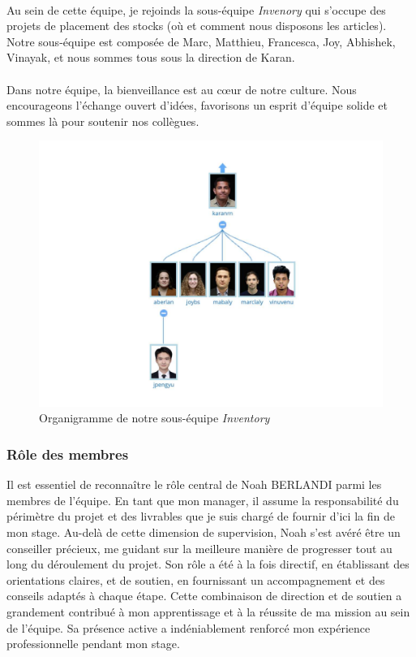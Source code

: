 \paragraph{}
\vspace{-2em}  %
Au sein de cette équipe, je rejoinds la sous-équipe \textit{Invenory} qui s'occupe des projets de placement des stocks (où et comment nous disposons les articles). Notre sous-équipe est composée de Marc, Matthieu, Francesca, Joy, Abhishek, Vinayak, et nous sommes tous sous la direction de Karan. 
\paragraph{}
\vspace{-2em}  %
Dans notre équipe, la bienveillance est au cœur de notre culture. Nous encourageons l'échange ouvert d'idées, favorisons un esprit d'équipe solide et sommes là pour soutenir nos collègues.

\newpage
\begin{figure}[htbp]
    \centering
    \includegraphics[width=0.8\linewidth]{./Graphismes-UTC/logos/Amazon/equipe.pdf}\hfill
    \caption{Organigramme de notre sous-équipe \textit{Inventory}} 
\end{figure}

\subsubsection{Rôle des membres}
\paragraphe{}
Il est essentiel de reconnaître le rôle central de Noah \MakeUppercase{Berlandi} parmi les membres de l'équipe. En tant que mon manager, il assume la responsabilité du périmètre du projet et des livrables que je suis chargé de fournir d'ici la fin de mon stage. Au-delà de cette dimension de supervision, Noah s'est avéré être un conseiller précieux, me guidant sur la meilleure manière de progresser tout au long du déroulement du projet. Son rôle a été à la fois directif, en établissant des orientations claires, et de soutien, en fournissant un accompagnement et des conseils adaptés à chaque étape. Cette combinaison de direction et de soutien a grandement contribué à mon apprentissage et à la réussite de ma mission au sein de l'équipe. Sa présence active a indéniablement renforcé mon expérience professionnelle pendant mon stage.

